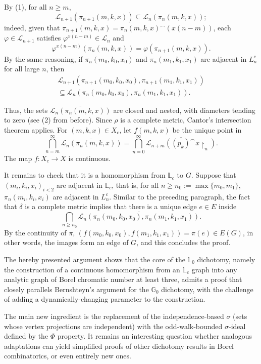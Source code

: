 By (1), for all $n\geq m$, $$\mathcal L_{n+1}(\pi_{n+1}(m,k,x))\subseteq\mathcal L_n(\pi_n(m,k,x));$$ indeed, given that $\pi_{n+1}(m,k,x)=\pi_n(m,k,x)^\frown(x(n-m))$, each $\varphi\in\mathcal L_{n+1}$ satisfies $\varphi^{x(n-m)}\in\mathcal L_n$ and $$\varphi^{x(n-m)}(\pi_n(m,k,x))=\varphi(\pi_{n+1}(m,k,x)).$$
By the same reasoning, if $\pi_n(m_0,k_0,x_0)$ and $\pi_n(m_1,k_1,x_1)$ are adjacent in $L^c_n$ for all large $n$, then \begin{align*}
    \mathcal L_{n+1}(\pi_{n+1}(m_0,k_0,x_0),\pi_{n+1}(m_1,k_1,x_1))\\
    \subseteq\mathcal L_n(\pi_n(m_0,k_0,x_0),\pi_n(m_1,k_1,x_1)).
\end{align*}

Thus, the sets $\overline{\mathcal L_n(\pi_n(m,k,x))}$ are closed and nested, with diameters tending to zero (see (2) from before).
Since $\rho$ is a complete metric, Cantor's intersection theorem applies.
For $(m,k,x)\in X_c$, let $f(m,k,x)$ be the unique point in $$\bigcap_{n=m}^\infty\overline{\mathcal L_n(\pi_n(m,k,x))}=\bigcap_{n=0}^\infty\overline{\mathcal L_{n+m}((p_k)^\frown x\restriction_n)}.$$
The map $f\colon X_c\to X$ is continuous.

It remains to check that it is a homomorphism from $\mathbb L_c$ to $G$.
Suppose that $(m_i,k_i,x_i)_{i<2}$ are adjacent in $\mathbb L_c$, that is, for all $n\geq n_0:=\max\{m_0,m_1\}$, $\pi_n(m_i,k_i,x_i)$ are adjacent in $L_n^c$.
Similar to the preceding paragraph, the fact that $\delta$ is a complete metric implies that there is a unique edge $e\in E$ inside $$\bigcap_{n\geq n_0}\overline{\mathcal L_n(\pi_n(m_0,k_0,x_0),\pi_n(m_1,k_1,x_1))}.$$
By the continuity of $\pi$, $(f(m_0,k_0,x_0),f(m_1,k_1,x_1))=\pi(e)\in E(G)$, in other words, the images form an edge of $G$, and this concludes the proof.

The hereby presented argument shows that the core of the $\mathbb{L}_0$ dichotomy, namely the construction of a continuous homomorphism from an $\mathbb{L}_c$ graph into any analytic graph of Borel chromatic number at least three, admits a proof that closely parallels Bernshteyn's argument for the $\mathbb{G}_0$ dichotomy, with the challenge of adding a dynamically-changing parameter to the construction.

The main new ingredient is the replacement of the independence-based $\sigma$ (sets whose vertex projections are independent) with the odd-walk-bounded $\sigma$-ideal defined by the $\Phi$ property.
It remains an interesting question whether analogous adaptations can yield simplified proofs of other dichotomy results in Borel combinatorics, or even entirely new ones.